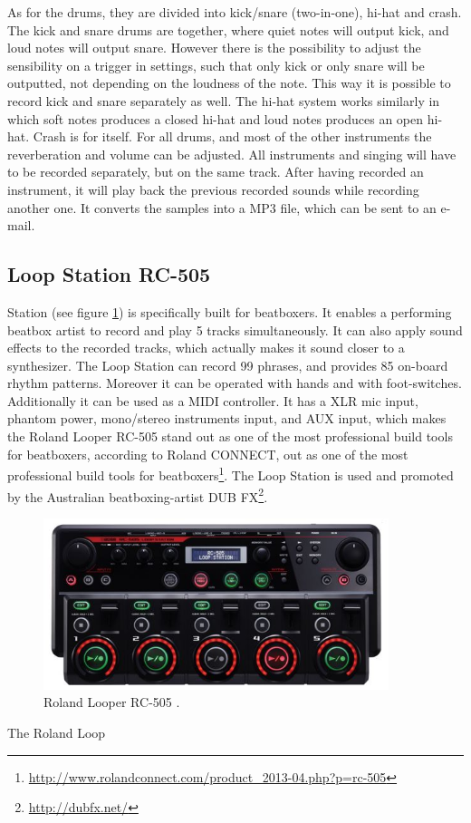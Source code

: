As for the drums, they are divided into kick/snare (two-in-one), hi-hat and crash. The kick and snare drums are together, where quiet notes will output kick, and loud notes will output snare. However there is the possibility to adjust the sensibility on a trigger in settings, such that only kick or only snare will be outputted, not depending on the loudness of the note. This way it is possible to record kick and snare separately as well. The hi-hat system works similarly in which soft notes produces a closed hi-hat and loud notes produces an open hi-hat. Crash is for itself. For all drums, and most of the other instruments the reverberation and volume can be adjusted. 
All instruments and singing will have to be recorded separately, but on the same track. After having recorded an instrument, it will play back the previous recorded sounds while recording another one. It converts the samples into a MP3 file, which can be sent to an e-mail. 

\subsection{ Loop Station RC-505 }
\label{loopstation}
 Station (see figure \ref{Looper}) is specifically built for beatboxers. It enables a performing beatbox artist to record and play 5 tracks simultaneously. It can also apply sound effects to the recorded tracks, which actually makes it sound closer to a synthesizer. The Loop Station can record 99 phrases, and provides 85 on-board rhythm patterns. Moreover it can be operated with hands and with foot-switches. Additionally it can be used as a MIDI controller. It has a XLR mic input, phantom power, mono/stereo instruments input, and AUX input, which makes the Roland Looper RC-505 stand out as one of the most professional build tools for beatboxers, according to Roland CONNECT, out as one of the most professional build tools for beatboxers\footnote{\url{http://www.rolandconnect.com/product_2013-04.php?p=rc-505}}.
The Loop Station is used and promoted by the Australian beatboxing-artist DUB FX\footnote{\url{http://dubfx.net/}}.

\begin{figure}[h]
	\begin{center}
		\includegraphics[height=5cm]{fig/Roland-RC-505.JPG}
		\caption{Roland Looper RC-505 \citep{ROLAND}.}
		\label{Looper}
	\end{center}
\end{figure}
The Roland Loop